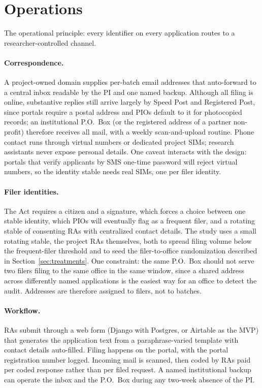 \documentclass[11pt]{article}
\begin{document}
\section{Operations}
\label{sec:operations}

The operational principle: every identifier on every application routes to a researcher-controlled channel.

\paragraph{Correspondence.} A project-owned domain supplies per-batch email addresses that auto-forward to a central inbox readable by the PI and one named backup. Although all filing is online, substantive replies still arrive largely by Speed Post and Registered Post, since portals require a postal address and PIOs default to it for photocopied records; an institutional P.O.\ Box (or the registered address of a partner non-profit) therefore receives all mail, with a weekly scan-and-upload routine. Phone contact runs through virtual numbers or dedicated project SIMs; research assistants never expose personal details. One caveat interacts with the design: portals that verify applicants by SMS one-time password will reject virtual numbers, so the identity stable needs real SIMs, one per filer identity.

\paragraph{Filer identities.} The Act requires a citizen and a signature, which forces a choice between one stable identity, which PIOs will eventually flag as a frequent filer, and a rotating stable of consenting RAs with centralized contact details. The study uses a small rotating stable, the project RAs themselves, both to spread filing volume below the frequent-filer threshold and to seed the filer-to-office randomization described in Section~\ref{sec:treatments}. One constraint: the same P.O.\ Box should not serve two filers filing to the same office in the same window, since a shared address across differently named applications is the easiest way for an office to detect the audit. Addresses are therefore assigned to filers, not to batches.

\paragraph{Workflow.} RAs submit through a web form (Django with Postgres, or Airtable as the MVP) that generates the application text from a paraphrase-varied template with contact details auto-filled. Filing happens on the portal, with the portal registration number logged. Incoming mail is scanned, then coded by RAs paid per coded response rather than per filed request. A named institutional backup can operate the inbox and the P.O.\ Box during any two-week absence of the PI.
\end{document}
